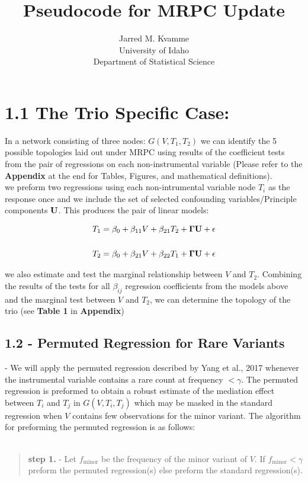 \documentclass[12pt]{report}
\begin{document}
\begin{titlepage}
\title{Pseudocode for MRPC Update}
\author{ Jarred M. Kvamme \\ University of Idaho \\ Department of Statistical Science }
\maketitle
\end{titlepage}

\newcommand{\indep}{\perp \!\!\! \perp}


\section*{1.1 The Trio Specific Case:}



In a network consisting of three nodes: $G( V, T_1, T_2)$ we can identify the 5 possible topologies laid out under MRPC using results of the coefficient tests from the pair of regressions on each non-instrumental variable (Please refer to the \textbf{Appendix} at the end for Tables, Figures, and mathematical definitions).\\

we preform two regressions using each non-intrumental variable node $T_i$ as the response once and we include the set of selected confounding variables/Principle components $\bf U$. This produces the pair of linear models:

\begin{eqnarray}
T_1 = \beta_0 +\beta_{11}V+\beta_{21}T_2+{\bf \Gamma U}+ \epsilon \\
\nonumber\\
T_2 = \beta_0 +\beta_{21}V+\beta_{22}T_1+{\bf \Gamma U}+ \epsilon 
\end{eqnarray}

we also estimate and test the marginal relationship between $V$ and $T_2$. Combining the results of the tests for all $\beta_{ij}$ regression coefficients from the models above and the marginal test between $V$ and $T_2$, we can determine the topology of the trio (see \textbf{Table 1} in \textbf{Appendix})

\subsection*{1.2 - Permuted Regression for Rare Variants} - We will apply the permuted regression described by Yang et al., 2017 whenever the instrumental variable contains a rare count at frequency $< \gamma$. The permuted regression is preformed to obtain a robust estimate of the mediation effect between $T_i$ and $T_j$ in $G(V, T_i, T_j)$ which may be masked in the standard regression when $V$ contains few observations for the minor variant. The algorithm for preforming the permuted regression is as follows:\\
\\
\begin{quote}
\textbf{step 1.} - Let $f_{\text{minor}}$ be the frequency of the minor variant of $V$. If $f_{\text{minor}} < \gamma$ preform the permuted regression(s) else preform the standard regression(s).
\end{quote}
\end{document}
